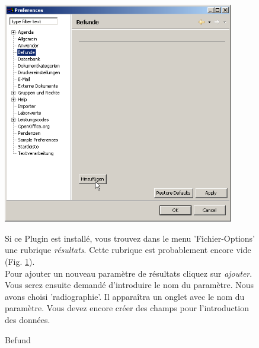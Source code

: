 \begin{figure}[htbp]
   \begin{minipage}{0.35\textwidth}
       \centering
       \includegraphics[width=0.9\textwidth]{images/befunde1}
       \caption{Befund}
       \label{fig:befundesettings}
     \end{minipage}\hfill
     \begin{minipage}{0.65\textwidth}
     Si ce Plugin est installé, vous trouvez dans le menu 'Fichier-Options' une rubrique  \textit{résultats}. Cette rubrique est probablement encore vide  (Fig. \ref{fig:befundesettings}).\\

     Pour ajouter un nouveau paramètre de résultats cliquez sur \textit{ajouter}. Vous serez ensuite demandé d'introduire le nom du paramètre. Nous avons choisi 'radiographie'. Il apparaîtra un onglet avec le nom du paramètre. Vous devez encore créer des champs pour l'introduction des données.

    \end{minipage}
\end{figure}
